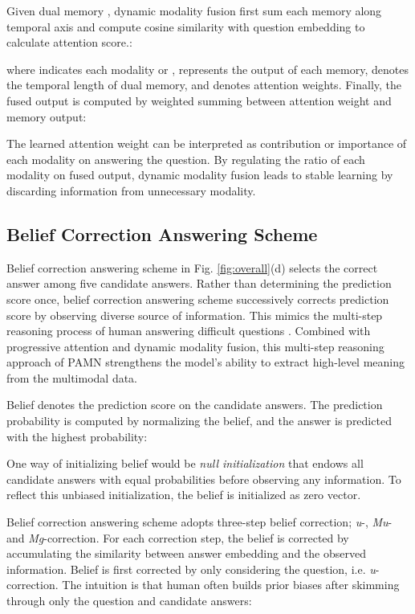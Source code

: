 \documentclass[10pt,twocolumn,letterpaper]{article}
\begin{document}
Given dual memory , dynamic modality fusion first sum each memory along temporal axis and compute cosine similarity with question embedding  to calculate attention score.:

where  indicates each modality  or ,  represents the output of each memory,  denotes the temporal length of dual memory, and  denotes attention weights. Finally, the fused output  is computed by weighted summing between attention weight and memory output:

The learned attention weight can be interpreted as contribution or importance of each modality on answering the question. By regulating the ratio of each modality on fused output, dynamic modality fusion leads to stable learning by discarding information from unnecessary modality.

\subsection{Belief Correction Answering Scheme}

Belief correction answering scheme in Fig. \ref{fig:overall}(d) selects the correct answer among five candidate answers. Rather than determining the prediction score once, belief correction answering scheme successively corrects prediction score by observing diverse source of information. This mimics the multi-step reasoning process of human answering difficult questions \cite{human}. Combined with progressive attention and dynamic modality fusion, this multi-step reasoning approach of PAMN strengthens the model's ability to extract high-level meaning from the multimodal data. 

Belief  denotes the prediction score on the candidate answers. The prediction probability  is computed by normalizing the belief, and the answer  is predicted with the highest probability:

One way of initializing belief would be \textit{null initialization} that endows all candidate answers with equal probabilities before observing any information. To reflect this unbiased initialization, the belief  is initialized as zero vector.

Belief correction answering scheme adopts three-step belief correction; \textit{u}-, \textit{Mu}- and \textit{Mg}-correction. For each correction step, the belief is corrected by accumulating the similarity between answer embedding  and the observed information. Belief is first corrected by only considering the question, i.e. \textit{u}-correction. The intuition is that human often builds prior biases after skimming through only the question and candidate answers:
\end{document}
